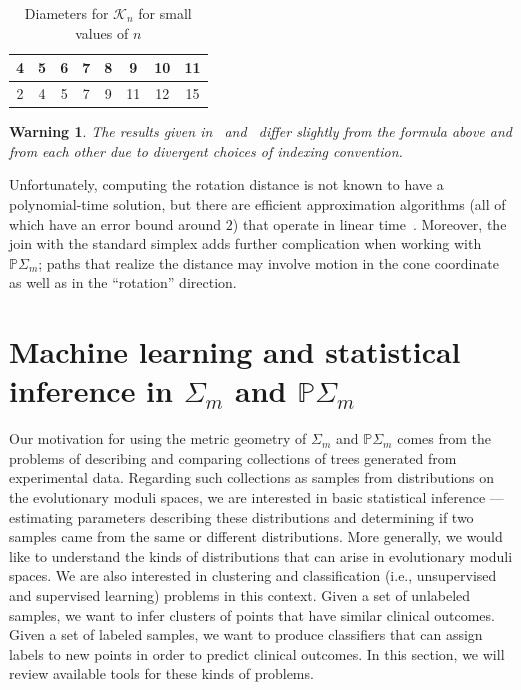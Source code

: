 \documentclass[a4paper,11pt]{article}
\newtheorem{warning}[theorem]{Warning}
\newcommand{\aK}{\mathcal{K}}
\begin{document}
\begin{table}[ht]
    \caption{Diameters for $\aK_n$ for small values of $n$}
    \centering
    \begin{tabular}{c c c c c c c c}
    \hline\hline
    4 & 5 & 6 & 7 & 8 & 9 & 10 & 11 \\
    \hline
    2 & 4 & 5 & 7 & 9 & 11 & 12 & 15 \\
    \hline
    \end{tabular}
\end{table}

\begin{warning}
The results given in~\cite{pournin2014diameter}
and~\cite{sleator1988rotation} differ slightly from the formula above
and from each other due to divergent choices of indexing convention.
\end{warning}

Unfortunately, computing the rotation distance is not known to have a
polynomial-time solution, but there are efficient approximation
algorithms (all of which have an error bound around $2$) that operate
in linear time~\cite{cleary2010linear}.  Moreover, the join with the
standard simplex adds further complication when working with
$\mathbb{P}\Sigma_m$; paths that realize the distance may involve
motion in the cone coordinate as well as in the ``rotation''
direction.


\section{Machine learning and statistical inference in $\Sigma_m$ and $\mathbb{P}\Sigma_m$}\label{sec:ML}

Our motivation for using the metric geometry of $\Sigma_m$ and $\mathbb{P}\Sigma_m$ comes from the problems of describing and comparing collections of trees generated from experimental data.
Regarding such collections as samples from distributions on the evolutionary moduli spaces, we are interested in basic statistical inference --- estimating parameters describing these distributions and determining if two samples came from the same or different distributions.
More generally, we would like to understand the kinds of distributions that can arise in evolutionary moduli spaces.
We are also interested in clustering and classification (i.e., unsupervised and supervised learning) problems in this context.
Given a set of unlabeled samples, we want to infer clusters of points that have similar clinical outcomes.
Given a set of labeled samples, we want to produce classifiers that
can assign labels to new points in order to predict clinical outcomes.
In this section, we will review available tools for these kinds of problems.
\end{document}
